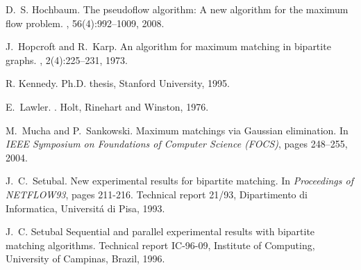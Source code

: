 \documentclass{article}
\begin{document}
\begin{thebibliography}{99}
D.~S. Hochbaum.
\newblock The pseudoflow algorithm: A new algorithm for the maximum flow problem.
, 56(4):992--1009, 2008.

J.~Hopcroft and R.~Karp.
\newblock An  algorithm for maximum matching in bipartite graphs.
, 2(4):225--231, 1973.

\newblock R. Kennedy.
\newblock Ph.D. thesis, Stanford University, 1995.

E.~Lawler.
.
\newblock Holt, Rinehart and Winston, 1976.

M.~Mucha and P.~Sankowski.
\newblock Maximum matchings via Gaussian elimination.
\newblock In {\em IEEE Symposium on Foundations of Computer Science (FOCS)}, pages 248--255, 2004.

J.~C.~Setubal.
\newblock New experimental results for bipartite matching.
\newblock In {\em Proceedings of NETFLOW93},
\newblock pages 211-216.
\newblock Technical report 21/93, Dipartimento di Informatica, Universit\'a di Pisa, 1993.

J.~C. Setubal
\newblock Sequential and parallel experimental results with bipartite matching algorithms.
\newblock Technical report IC-96-09, Institute of Computing, University of Campinas, Brazil, 1996.

\end{thebibliography}

\newpage
\clearpage
\end{document}
